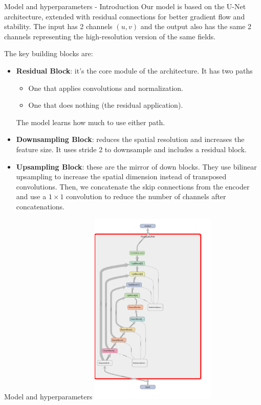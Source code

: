 \documentclass[8pt]{beamer}
\begin{document}
\begin{frame}{Model and hyperparameters - Introduction}
    Our model is based on the U-Net architecture, extended with residual connections for better gradient flow and stability.
    The input has 2 channels $(u,v)$ and the output also has the same 2 channels representing the high-resolution version of the same fields.

    The key building blocks are:
    \begin{itemize}
        \item \textbf{Residual Block}: it's the core module of the architecture. It has two paths
        \begin{itemize}
            \item One that applies convolutions and normalization.
            \item One that does nothing (the residual application).
        \end{itemize}
        The model learns how much to use either path.
        \item \textbf{Downsampling Block}: reduces the spatial resolution and increases the feature size. It uses stride 2 to downsample and includes a residual block.
        \item \textbf{Upsampling Block}: these are the mirror of down blocks. They use bilinear upsampling to increase the spatial dimension instead of transposed convolutions. Then, we concatenate  the skip connections from the encoder and use a $1\times 1$ convolution to reduce the number of channels after concatenations.
    \end{itemize}
    \end{frame}

    \begin{frame}{Model and hyperparameters}
    \centering
    \includegraphics[width=0.45\textwidth]{images/unet_experiment_graph.png}
\end{frame}
\end{document}
